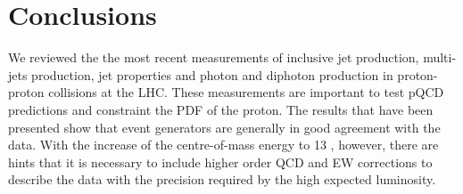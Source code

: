 \documentclass{PoS}
\begin{document}
\section{Conclusions}

We reviewed the the most recent measurements of inclusive jet production, multi-jets production, jet properties and
photon and diphoton production in proton-proton collisions at the LHC. These measurements are important to test pQCD
predictions and constraint the PDF of the proton. The results that have been presented show that
event generators are generally in good agreement with the data. With the increase of the
centre-of-mass energy to 13 \TeV, however, there are hints that it is necessary to include higher order QCD and EW
corrections to describe the data with the precision required by the high expected luminosity. 
\end{document}
